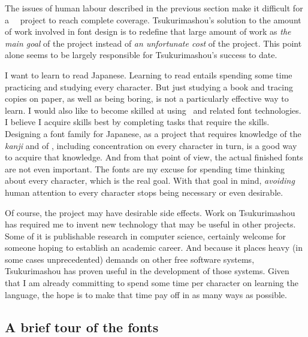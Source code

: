 \documentclass{ltugboat}
\begin{document}
The issues of human labour described in the previous section make it
difficult for a \CJK\ \MF\ project to reach complete coverage. 
Tsukurimashou's solution to the amount of work involved in font design is to
redefine that large amount of work as \emph{the main goal} of the project
instead of \emph{an unfortunate cost} of the project.  This point alone
seems to be largely responsible for Tsukurimashou's success to date.

I want to learn to read Japanese.  Learning to read entails spending some
time practicing and studying every character.  But just studying a book and
tracing copies on paper, as well as being boring, is not a particularly
effective way to learn.  I would also like to become skilled at using \MF\
and related font technologies.  I believe I acquire skills best by
completing tasks that require the skills.  Designing a font family for
Japanese, as a project that requires knowledge of the \emph{kanji} and of \MF,
including concentration on every character in turn, is a good way to acquire
that knowledge.  And from that point of view, the actual finished fonts are
not even important.  The fonts are my excuse for spending time thinking
about every character, which is the real goal.  With that goal in mind,
\emph{avoiding} human attention to every character stops being necessary or
even desirable.

Of course, the project may have desirable side effects.  Work on
Tsukurimashou has required me to invent new technology that may be useful in
other projects.  Some of it is publishable research in computer science,
certainly welcome for someone hoping to establish an academic career.  And
because it places heavy (in some cases unprecedented) demands on other free
software systems, Tsukurimashou has proven useful in the development of
those systems.  Given that I am already committing to spend some time per
character on learning the language, the hope is to make that time pay off in
as many ways as possible.

\subsection{A brief tour of the fonts}
\end{document}
